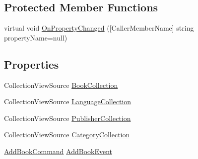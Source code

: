 \subsection*{Protected Member Functions}
\begin{DoxyCompactItemize}
\item 
virtual void \mbox{\hyperlink{class_easy_library_application_1_1_w_p_f_1_1_view_model_1_1_c_r_u_d_books_view_model_a25e45b4f535a52f29a3015866eb0f423}{On\+Property\+Changed}} (\mbox{[}Caller\+Member\+Name\mbox{]} string property\+Name=null)
\end{DoxyCompactItemize}
\subsection*{Properties}
\begin{DoxyCompactItemize}
\item 
Collection\+View\+Source \mbox{\hyperlink{class_easy_library_application_1_1_w_p_f_1_1_view_model_1_1_c_r_u_d_books_view_model_a72b731057bc08f5b063981b37acdf340}{Book\+Collection}}
\item 
Collection\+View\+Source \mbox{\hyperlink{class_easy_library_application_1_1_w_p_f_1_1_view_model_1_1_c_r_u_d_books_view_model_ad5e082cdcc0006d46694c8a56b4c67ee}{Language\+Collection}}
\item 
Collection\+View\+Source \mbox{\hyperlink{class_easy_library_application_1_1_w_p_f_1_1_view_model_1_1_c_r_u_d_books_view_model_a8e714d962698bc04c2cad27262f3afc4}{Publisher\+Collection}}
\item 
Collection\+View\+Source \mbox{\hyperlink{class_easy_library_application_1_1_w_p_f_1_1_view_model_1_1_c_r_u_d_books_view_model_ad79a2b263dc0a893d0333d337b4b2855}{Category\+Collection}}
\item 
\mbox{\hyperlink{class_easy_library_application_1_1_w_p_f_1_1_commands_1_1_add_book_command}{Add\+Book\+Command}} \mbox{\hyperlink{class_easy_library_application_1_1_w_p_f_1_1_view_model_1_1_c_r_u_d_books_view_model_ab1840907e40ea46687b1029bbb96873f}{Add\+Book\+Event}}
\item 

\end{DoxyCompactItemize}
